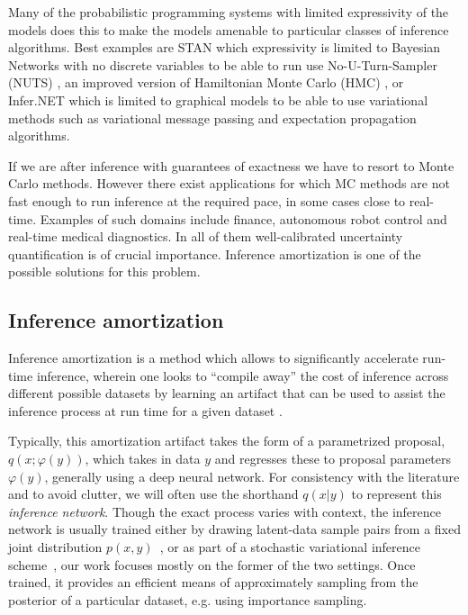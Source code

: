 \documentclass[12pt]{article}
\begin{document}
Many of the probabilistic programming systems with limited expressivity of the models does this to make the models amenable to particular classes of inference algorithms. 
Best examples are STAN which expressivity is limited to Bayesian Networks with no discrete variables to be able to run use No-U-Turn-Sampler (NUTS) \citep{NUTS}, an improved version of Hamiltonian Monte Carlo (HMC) \citep{HMC}, or Infer.NET which is limited to graphical models to be able to use variational methods such as variational message passing \citep{variationalmessagepassing} and expectation propagation \citep{EP} algorithms.

If we are after inference with guarantees of exactness we have to resort to Monte Carlo methods.
However there exist applications for which MC methods are not fast enough to run inference at the required pace, in some cases close to real-time.
Examples of such domains include finance, autonomous robot control and real-time medical diagnostics.
In all of them well-calibrated uncertainty quantification is of crucial importance.
Inference amortization is one of the possible solutions for this problem.


\subsection{Inference amortization}
Inference amortization is a method which allows to significantly accelerate run-time inference, wherein one looks to ``compile away'' the cost of inference
across different possible datasets
by learning an artifact that can be used to assist the inference process
at run time for a given dataset
\citep{StuhlmullerEtAl2013, KingmaWelling2013, ritchie2016deep, PaigeWood2016, LeEtAl2016, LeEtAl2017, MaddisonEtAl2017, NaessethEtAl2017}.

Typically, this amortization
artifact takes the form of a parametrized proposal, $q(x ; \varphi(y))$, which takes
in data $y$ and regresses these to proposal parameters $\varphi(y)$, generally using
a deep neural network.
For consistency with the literature and to avoid clutter, we will often
use the shorthand $q(x|y)$ to represent this \emph{inference network}.
Though the exact process varies with context,
the inference network is usually trained either by drawing latent-data
sample pairs from a fixed joint distribution
$p(x,y)$~\citep{ritchie2016deep,PaigeWood2016,LeEtAl2016}, or 
as part of a stochastic variational inference scheme~\citep{HoffmanEtAl2013,KingmaWelling2013,RezendeEtAl2014},
our work focuses mostly on the former of the two settings.
Once trained, it provides an efficient means of approximately
sampling from the posterior of a particular dataset, e.g. using importance sampling.
\end{document}
